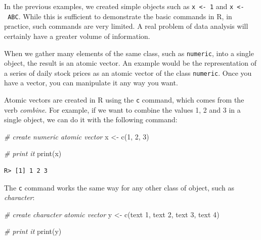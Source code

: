 \documentclass[
  12pt,
]{book}
\newenvironment{Shaded}{\begin{snugshade}}{\end{snugshade}}
\newcommand{\CommentTok}[1]{\textcolor[rgb]{0.37,0.37,0.37}{\textit{#1}}}
\newcommand{\DecValTok}[1]{\textcolor[rgb]{0.06,0.06,0.06}{#1}}
\newcommand{\FunctionTok}[1]{\textcolor[rgb]{0,0,0}{#1}}
\newcommand{\NormalTok}[1]{#1}
\newcommand{\OtherTok}[1]{\textcolor[rgb]{0.37,0.37,0.37}{#1}}
\newcommand{\StringTok}[1]{\textcolor[rgb]{0.5,0.5,0.5}{#1}}
\begin{document}
In the previous examples, we created simple objects such as \texttt{x\ \textless{}-\ 1} and \texttt{x\ \textless{}-\ \textquotesingle{}ABC\textquotesingle{}}. While this is sufficient to demonstrate the basic commands in R, in practice, such commands are very limited. A real problem of data analysis will certainly have a greater volume of information.

When we gather many elements of the same class, such as \texttt{numeric}, into a single object, the result is an atomic vector. An example would be the representation of a series of daily stock prices as an atomic vector of the class \texttt{numeric}. Once you have a vector, you can manipulate it any way you want.

Atomic vectors are created in R using the \texttt{c} command, which comes from the verb \emph{combine}. For example, if we want to combine the values 1, 2 and 3 in a single object, we can do it with the following command: 

\begin{Shaded}
\begin{Highlighting}[]
\CommentTok{\# create numeric atomic vector}
\NormalTok{x }\OtherTok{\textless{}{-}} \FunctionTok{c}\NormalTok{(}\DecValTok{1}\NormalTok{, }\DecValTok{2}\NormalTok{, }\DecValTok{3}\NormalTok{)}

\CommentTok{\# print it}
\FunctionTok{print}\NormalTok{(x)}
\end{Highlighting}
\end{Shaded}

\begin{verbatim}
R> [1] 1 2 3
\end{verbatim}

The \texttt{c} command works the same way for any other class of object, such as \emph{character}:

\begin{Shaded}
\begin{Highlighting}[]
\CommentTok{\# create character atomic vector}
\NormalTok{y }\OtherTok{\textless{}{-}} \FunctionTok{c}\NormalTok{(}\StringTok{\textquotesingle{}text 1\textquotesingle{}}\NormalTok{, }\StringTok{\textquotesingle{}text 2\textquotesingle{}}\NormalTok{, }\StringTok{\textquotesingle{}text 3\textquotesingle{}}\NormalTok{, }\StringTok{\textquotesingle{}text 4\textquotesingle{}}\NormalTok{)}

\CommentTok{\# print it}
\FunctionTok{print}\NormalTok{(y)}
\end{Highlighting}
\end{Shaded}
\end{document}
